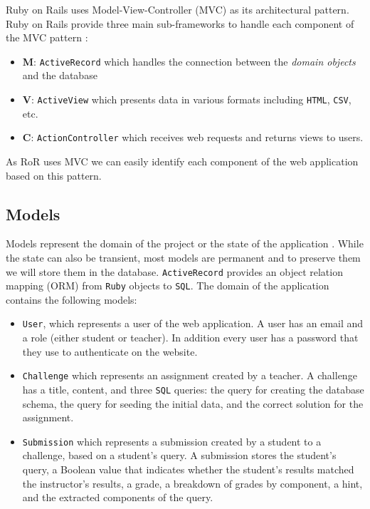 Ruby on Rails uses Model-View-Controller (MVC) as its architectural pattern. Ruby on Rails provide three main sub-frameworks to handle each component of the MVC pattern \citep{ruby_on_rails}:
\begin{itemize}
    \item \textbf{M}: \texttt{ActiveRecord} which handles the connection between the \textit{domain objects} and the database
    \item \textbf{V}: \texttt{ActiveView} which presents data in various formats including \texttt{HTML}, \texttt{CSV}, etc.
    \item \textbf{C}: \texttt{ActionController} which receives web requests and returns views to users.
\end{itemize}
As RoR uses MVC we can easily identify each component of the web application based on this pattern.

\subsection{Models}

Models represent the domain of the project \citep{ruby_on_rails} or the state of the application \citep{ruby_on_rails_book}. While the state can also be transient, most models are permanent and to preserve them we will store them in the database. \texttt{ActiveRecord} provides an object relation mapping (ORM) from \texttt{Ruby} objects to \texttt{SQL}. The domain of the application contains the following models:
\begin{itemize}
    \item \texttt{User}, which represents a user of the web application. A user has an email and a role (either student or teacher). In addition every user has a password that they use to authenticate on the website.
    \item \texttt{Challenge} which represents an assignment created by a teacher. A challenge has a title, content, and three \texttt{SQL} queries: the query for creating the database schema, the query for seeding the initial data, and the correct solution for the assignment.
    \item \texttt{Submission} which represents a submission created by a student to a challenge, based on a student's query. A submission stores the student's query, a Boolean value that indicates whether the student's results matched the instructor's results, a grade, a breakdown of grades by component, a hint, and the extracted components of the query.
\end{itemize}

